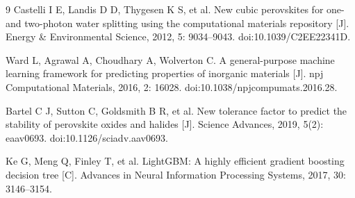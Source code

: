 \begin{thebibliography}{9}
Castelli I E, Landis D D, Thygesen K S, et al. New cubic perovskites for one- and two-photon water splitting using the computational materials repository [J]. Energy \& Environmental Science, 2012, 5: 9034--9043. doi:10.1039/C2EE22341D.

Ward L, Agrawal A, Choudhary A, Wolverton C. A general-purpose machine learning framework for predicting properties of inorganic materials [J]. npj Computational Materials, 2016, 2: 16028. doi:10.1038/npjcompumats.2016.28.

Bartel C J, Sutton C, Goldsmith B R, et al. New tolerance factor to predict the stability of perovskite oxides and halides [J]. Science Advances, 2019, 5(2): eaav0693. doi:10.1126/\allowbreak sciadv.aav0693.

Ke G, Meng Q, Finley T, et al. LightGBM: A highly efficient gradient boosting decision tree [C]. Advances in Neural Information Processing Systems, 2017, 30: 3146--3154.
\end{thebibliography}
